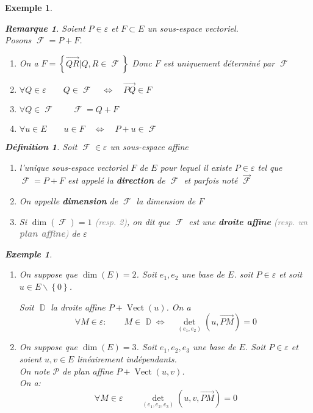 \documentclass[a4paper, oneside]{report}
\theoremstyle{break}
\newtheorem{definition}[thm]{Définition}
\newtheorem{exemple}[thm]{Exemple}
\newtheorem{remarque}[thm]{Remarque}
\newcommand{\gray}[1]{\textcolor{gray}{#1}}
\DeclareMathOperator{\D}{\mathbb{D}}
\DeclareMathOperator{\F}{\mathcal{F}}
\renewcommand{\P}{\mathcal{P}}
\DeclarePairedDelimiter\ens{\left\{ }{\right\} }%
\DeclareMathOperator{\Vect}{Vect}
\renewcommand{\ens}[1]{\left\{ #1 \right\} }%
\newcommand{\slign}{\textbf}
\newcommand{\Ens}{\ens}
\newcommand{\ensF}{\F}
\newcommand{\ensP}{\P}
\newcommand{\ensD}{\D}
\begin{document}
\begin{exemple}
\begin{remarque}
Soient $P \in \varepsilon$ et $F \subset E$ un sous-espace vectoriel.\\
Posons $\ensF = P + F$.
\begin{enumerate}
\item On a $F = \Ens{\vec{QR} \big| Q, R \in \ensF}$
\newline
Donc $F$ est uniquement déterminé par $\ensF$

\item $\forall Q \in \varepsilon		\qquad	Q \in \ensF		\quad	\Leftrightarrow	\quad	\vec{PQ} \in F$

\item $\forall Q \in \ensF				\qquad	\ensF = Q + F$

\item $\forall u \in E					\qquad	u \in F	\quad	\Leftrightarrow	\quad	P + u \in \ensF$
\end{enumerate}
\end{remarque}

\begin{definition}
Soit $\ensF \in \varepsilon$ un sous-espace affine
\begin{enumerate}
\item l'unique sous-espace vectoriel $F$ de $E$ pour lequel il existe $P \in \varepsilon$ tel que $\ensF = P + F$ est appelé la \slign{direction} de $\ensF$ et parfois noté $\vec{\ensF}$

\item On appelle \slign{dimension} de $\ensF$ la dimension de $F$

\item Si $\dim(\ensF) = 1$ \gray{(resp. 2)}, on dit que $\ensF$ est une \slign{droite affine} \gray{(resp. un \slign{plan affine})} de $\varepsilon$
\end{enumerate}
\end{definition}

\begin{exemple}
\begin{enumerate}
\item  On suppose que $\dim(E) = 2$. Soit $e_1, e_2$ une base de $E$. soit $P \in \varepsilon$ et soit $u \in E \backslash \ens{0}$.

Soit $\ensD$ la droite affine $P + \Vect(u)$. On a
\[
\forall M \in \varepsilon :	\qquad		M \in \ensD \Leftrightarrow	\quad	\det_{(e_1, e_2)}(u, \vec{PM}) = 0
\]

\medbreak

\item  On suppose que $\dim(E) = 3$. Soit $e_1, e_2, e_3$ une base de $E$. Soit $P \in \varepsilon$ et soient $u, v \in E$ linéairement indépendants.\\
On note $\ensP$ de plan affine $P + \Vect(u, v)$.\\
On a:
\[
\forall M \in \varepsilon	\qquad		\det_{(e_1, e_2, e_3)}(u, v, \vec{PM}) = 0
\]
\end{enumerate}
\end{exemple}


\end{exemple}
\end{document}
